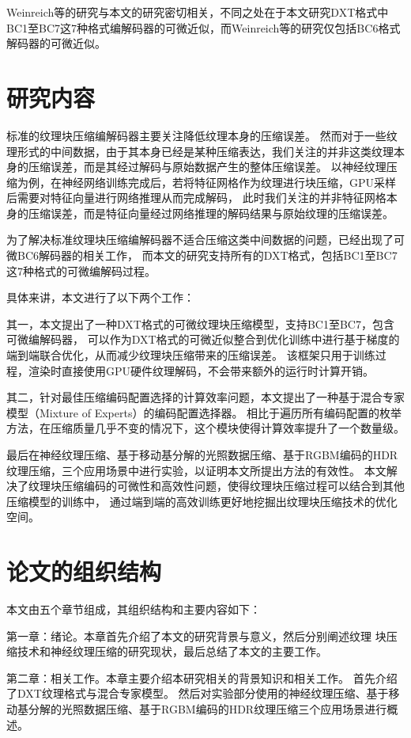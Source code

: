 Weinreich等的研究与本文的研究密切相关，不同之处在于本文研究DXT格式中BC1至BC7这7种格式编解码器的可微近似，而Weinreich等的研究仅包括BC6格式解码器的可微近似。

\section{研究内容}

标准的纹理块压缩编解码器主要关注降低纹理本身的压缩误差。
然而对于一些纹理形式的中间数据，由于其本身已经是某种压缩表达，我们关注的并非这类纹理本身的压缩误差，而是其经过解码与原始数据产生的整体压缩误差。
以神经纹理压缩为例，在神经网络训练完成后，若将特征网格作为纹理进行块压缩，GPU采样后需要对特征向量进行网络推理从而完成解码，
此时我们关注的并非特征网格本身的压缩误差，而是特征向量经过网络推理的解码结果与原始纹理的压缩误差。

为了解决标准纹理块压缩编解码器不适合压缩这类中间数据的问题，已经出现了可微BC6解码器的相关工作\cite{weinreich2024real}，
而本文的研究支持所有的DXT格式，包括BC1至BC7这7种格式的可微编解码过程。

具体来讲，本文进行了以下两个工作：

其一，本文提出了一种DXT格式的可微纹理块压缩模型，支持BC1至BC7，包含可微编解码器，
可以作为DXT格式的可微近似整合到优化训练中进行基于梯度的端到端联合优化，从而减少纹理块压缩带来的压缩误差。
该框架只用于训练过程，渲染时直接使用GPU硬件纹理解码，不会带来额外的运行时计算开销。

其二，针对最佳压缩编码配置选择的计算效率问题，本文提出了一种基于混合专家模型（Mixture of Experts）的编码配置选择器。
相比于遍历所有编码配置的枚举方法，在压缩质量几乎不变的情况下，这个模块使得计算效率提升了一个数量级。

最后在神经纹理压缩、基于移动基分解的光照数据压缩、基于RGBM编码的HDR纹理压缩，三个应用场景中进行实验，以证明本文所提出方法的有效性。
本文解决了纹理块压缩编码的可微性和高效性问题，使得纹理块压缩过程可以结合到其他压缩模型的训练中，
通过端到端的高效训练更好地挖掘出纹理块压缩技术的优化空间。

\section{论文的组织结构}

本文由五个章节组成，其组织结构和主要内容如下：

第一章：绪论。本章首先介绍了本文的研究背景与意义，然后分别阐述纹理
块压缩技术和神经纹理压缩的研究现状，最后总结了本文的主要工作。

第二章：相关工作。本章主要介绍本研究相关的背景知识和相关工作。
首先介绍了DXT纹理格式与混合专家模型。
然后对实验部分使用的神经纹理压缩、基于移动基分解的光照数据压缩、基于RGBM编码的HDR纹理压缩三个应用场景进行概述。

